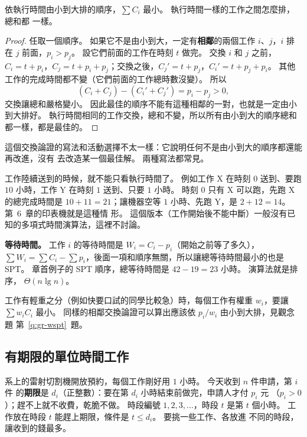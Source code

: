 \begin{theorem}
\label{thm:gr-spt}
依執行時間由小到大排的順序，$\sum C_i$ 最小。 執行時間一樣的工作之間怎麼排，總和都
一樣。
\end{theorem}

\begin{proof}
任取一個順序。 如果它不是由小到大，一定有\textbf{相鄰}的兩個工作 $i$、$j$，$i$ 排在
$j$ 前面，$p_i > p_j$。 設它們前面的工作在時刻 $t$ 做完。 交換 $i$ 和 $j$ 之前，
$C_i = t + p_i$，$C_j = t + p_i + p_j$；交換之後，$C_j' = t + p_j$，$C_i' = t + p_j + p_i$。
其他工作的完成時間都不變（它們前面的工作總時數沒變）。 所以
\[
(C_i + C_j) - (C_i' + C_j') = p_i - p_j > 0,
\]
交換讓總和嚴格變小。 因此最佳的順序不能有這種相鄰的一對，也就是一定由小到大排好。
執行時間相同的工作交換，總和不變，所以所有由小到大的順序總和都一樣，都是最佳的。
\end{proof}

這個交換論證的寫法和活動選擇不太一樣：它說明任何不是由小到大的順序都還能再改進，沒有
去改造某一個最佳解。 兩種寫法都常見。

工作陸續送到的時候，就不能只看執行時間了。 例如工作 X 在時刻 $0$ 送到、要跑 $10$ 小時，工作
Y 在時刻 $1$ 送到、只要 $1$ 小時。 時刻 $0$ 只有 X 可以跑，先跑 X 的總完成時間是
$10 + 11 = 21$；讓機器空等 $1$ 小時、先跑 Y，是 $2 + 12 = 14$。 第~6~章的印表機就是這種情
形。 這個版本（工作開始後不能中斷）一般沒有已知的多項式時間演算法，這裡不討論。

\textbf{等待時間。} 工作 $i$ 的等待時間是 $W_i = C_i - p_i$（開始之前等了多久），
$\sum W_i = \sum C_i - \sum p_i$，後面一項和順序無關，所以讓總等待時間最小的也是 SPT。
章首例子的 SPT 順序，總等待時間是 $42 - 19 = 23$ 小時。 演算法就是排序，
$\Theta(n \lg n)$。

工作有輕重之分（例如快要口試的同學比較急）時，每個工作有權重 $w_i$，要讓 $\sum w_i
C_i$ 最小。 同樣的相鄰交換論證可以算出應該依 $p_i / w_i$ 由小到大排，見觀念題
第~\ref{q:gr-wspt}~題。

\subsection{有期限的單位時間工作}
\label{sec:gr-deadline}

系上的雷射切割機開放預約，每個工作剛好用 $1$ 小時。 今天收到 $n$ 件申請，第 $i$ 件
的\textbf{期限}是 $d_i$（正整數）：要在第 $d_i$ 小時結束前做完，申請人才付 $p_i$ 元
（$p_i > 0$）；趕不上就不收費，乾脆不做。 時段編號 $1, 2, 3, \ldots$，時段 $t$ 是第
$t$ 個小時。 工作放在時段 $t$ 能趕上期限，條件是 $t \le d_i$。 要挑一些工作、各放進
不同的時段，讓收到的錢最多。

